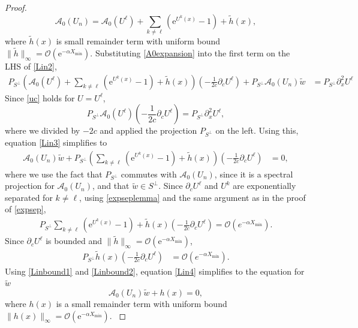 \documentclass[review,onefignum,onetabnum]{siamart171218}
\newcommand{\rme}{\mathrm{e}}
\newcommand{\calA}{\mathcal{A}}
\begin{document}
\begin{proof}
{\begin{equation}\label{A0expansion}
\calA_0(U_n) = \calA_0(U^\ell) + \sum_{k \neq \ell} (\rme^{U^k(x)} - 1) + \tilde{h}(x),
\end{equation}
where $\tilde{h}(x)$ is small remainder term with uniform bound $\|\tilde{h}\|_\infty = \mathcal{O}(\rme^{-\alpha X_{\mathrm{min}}})$. Substituting \cref{A0expansion} into the first term on the LHS of \cref{Lin2},
\begin{align}\label{Lin3}
P_{S^\perp} \left( \calA_0(U^\ell) + \sum_{k \neq \ell} (\rme^{U^k(x)} - 1) + \tilde{h}(x) \right) \left(-\frac{1}{2c}\partial_cU^\ell \right) + P_{S^\perp} \calA_0(U_n) \tilde{w} &= P_{S^\perp}\partial_x^2U^\ell
\end{align}
Since \cref{uc} holds for $U = U^\ell$,
\begin{equation}
P_{S^\perp} \calA_0(U^\ell) \left( -\frac{1}{2c} \partial_c U^\ell \right) = P_{S^\perp}\partial_x^2 U^\ell,
\end{equation}
where we divided by $-2c$ and applied the projection $P_{S^\perp}$ on the left. Using this, equation \cref{Lin3} simplifies to
\begin{align}\label{Lin4}
\calA_0(U_n) \tilde{w} +
P_{S^\perp} \left( \sum_{k \neq \ell} (\rme^{U^k(x)} - 1) + \tilde{h}(x) \right) \left(-\frac{1}{2c}\partial_cU^\ell \right) &= 0,
\end{align}
where we use the fact that $P_{S^\perp}$ commutes with $\calA_0(U_n)$, since it is a spectral projection for $\calA_0(U_n)$, and that $\tilde{w} \in S^\perp$. Since $\partial_c U^\ell$ and $U^k$ are exponentially separated for $k \neq \ell$, using \cref{expseplemma} and the same argument as in the proof of \cref{expsep},
\begin{align}\label{Linbound1}
P_{S^\perp} \sum_{k \neq \ell} (\rme^{U^k(x)} - 1) + \tilde{h}(x) \left(-\frac{1}{2c}\partial_cU^\ell \right) = \mathcal{O}\left(e^{-\alpha X_{\min}}\right).
\end{align}
Since $\partial_c U^\ell$ is bounded and  $\|\tilde{h}\|_\infty = \mathcal{O}(\rme^{-\alpha X_{\mathrm{min}}})$,
\begin{align}\label{Linbound2}
P_{S^\perp} \tilde{h}(x) \left(-\frac{1}{2c}\partial_cU^\ell \right) &=  \mathcal{O}\left(e^{-\alpha X_{\min}}\right).
\end{align}
Using \cref{Linbound1} and \cref{Linbound2}, equation \cref{Lin4} simplifies to the equation for $\tilde{w}$
\begin{equation}\label{A0heq}
\calA_0(U_n) \tilde{w} + h(x) = 0,
\end{equation}
where $h(x)$ is a small remainder term with uniform bound $\|h(x)\|_\infty = \mathcal{O}(\rme^{-\alpha X_{\mathrm{min}}})$.
}


\end{proof}
\end{document}
